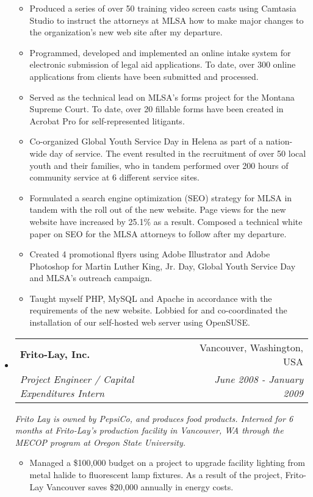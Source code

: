 \documentclass[a4paper,11pt]{article}
\makeatletter
\newcommand{\resitem}[1]{\item #1 \vspace{-2pt}}
\newcommand{\ressubheading}[4]{
\begin{tabular*}{6.5in}{l@{\cftdotfill{\cftsecdotsep}\extracolsep{\fill}}r}
        \textbf{#1} & #2 \\
        \textit{#3} & \textit{#4} \\
\end{tabular*}\vspace{-6pt}}
\makeatother
\begin{document}
\begin{itemize}
\begin{itemize}
            \resitem{Produced a series of over 50 training video screen casts using Camtasia Studio to instruct the attorneys at MLSA how to make major changes to the organization’s new web site after my departure.}

            \resitem{Programmed, developed and implemented an online intake system for electronic submission of legal aid applications. To date, over 300 online applications from clients have been submitted and processed.}

            \resitem{Served as the technical lead on MLSA’s forms project for the Montana Supreme Court. To date, over 20 fillable forms have been created in Acrobat Pro for self-represented litigants.}

            \resitem{Co-organized Global Youth Service Day in Helena as part of a nation-wide day of service. The event resulted in the recruitment of over 50 local youth and their families, who in tandem performed over 200 hours of community service at 6 different service sites.}

            \resitem{Formulated a search engine optimization (SEO) strategy for MLSA in tandem with the roll out of the new website. Page views for the new website have increased by 25.1\% as a result. Composed a technical white paper on SEO for the MLSA attorneys to follow after my departure.}

            \resitem{Created 4 promotional flyers using Adobe Illustrator and Adobe Photoshop for Martin Luther King, Jr. Day, Global Youth Service Day and MLSA’s outreach campaign.}

            \resitem{Taught myself PHP, MySQL and Apache in accordance with the requirements of the new website. Lobbied for and co-coordinated the installation of our self-hosted web server using OpenSUSE.}

    \end{itemize}

\item

    \ressubheading{Frito-Lay, Inc.}{Vancouver, Washington, USA}{Project Engineer / Capital Expenditures Intern}{June 2008 - January 2009}
    \linebreak
    \linebreak
    \emph{Frito Lay is owned by PepsiCo, and produces food products. Interned for 6 months at Frito-Lay’s production facility in Vancouver, WA through the MECOP program at Oregon State University.}
    \begin{itemize}
            \resitem{Managed a \$100,000 budget on a project to upgrade facility lighting from metal halide to fluorescent lamp fixtures. As a result of the project, Frito-Lay Vancouver saves \$20,000 annually in energy costs.}


\end{itemize}
\end{itemize}
\end{document}
